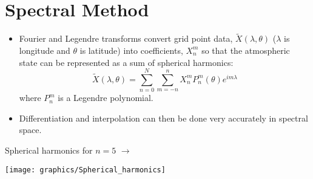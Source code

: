 \begin{minipage}[t]{0.68\columnwidth}%

\section*{Spectral Method}
\begin{itemize}
\item Fourier and Legendre transforms convert grid point data, $\tilde{X}(\lambda,\theta)$
($\lambda$ is longitude and $\theta$ is latitude) into coefficients,
$X_{n}^{m}$ so that the atmospheric state can be represented as a
sum of spherical harmonics:
\[
\tilde{X}(\lambda,\theta)=\sum_{n=0}^{N}\sum_{m=-n}^{n}X_{n}^{m}P_{n}^{m}(\theta)e^{im\lambda}
\]
where $P_{n}^{m}$ is a Legendre polynomial.
\item Differentiation and interpolation can then be done very accurately
in spectral space.
\end{itemize}
\begin{flushright}
\vspace{2cm}
Spherical harmonics for $n=5$ $\rightarrow$
\par\end{flushright}%
\end{minipage} %
\begin{minipage}[t]{0.3\columnwidth}%
\phantom{}\texttt{[image: graphics/Spherical\_harmonics]}%
\end{minipage}

\clearpage{}

